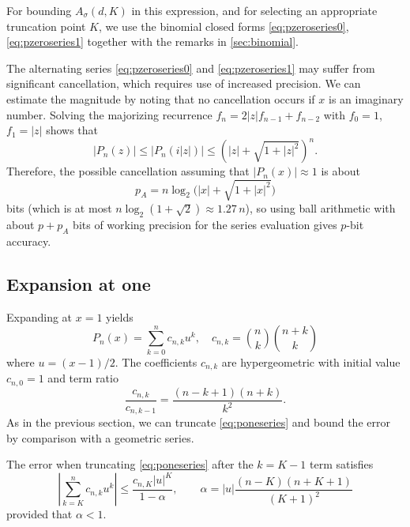 \documentclass[nohypdvips,review]{siamart0216}
\begin{document}
For bounding $A_{\sigma}(d,K)$ in this expression, and for selecting an
appropriate truncation point $K$, we use the binomial closed forms
\eqref{eq:pzeroseries0}, \eqref{eq:pzeroseries1} together with the
remarks in \cref{sec:binomial}.

The alternating series \cref{eq:pzeroseries0} and \cref{eq:pzeroseries1}
may suffer from significant cancellation, which requires use of
increased precision.
We can estimate the magnitude by
noting that no cancellation occurs
if $x$ is an imaginary number.
Solving the majorizing recurrence $f_n = 2 |z| f_{n-1} + f_{n-2}$ with
$f_0 = 1$, $f_1 = |z|$ shows that
\[ |P_n(z)| \le |P_n(i|z|)| \le \left(|z| + \sqrt{1 + |z|^2}\right)^n. \]
Therefore, the possible cancellation assuming that $|P_n(x)| \approx 1$
is about
\begin{equation*}
p_A = n \log_2\bigl(|x| + \sqrt{1 + |x|^2}\bigr)
\end{equation*}
bits (which is at most $n \log_2 (1+\sqrt{2}) \approx 1.27\, n$),
so using ball arithmetic with about $p + p_A$ bits of working precision
for the series evaluation gives $p$-bit accuracy.

\subsection{Expansion at one}

\label{sec:series-one}

Expanding at $x = 1$ yields
\begin{equation}
\label{eq:poneseries}
P_n(x) = \sum_{k=0}^n c_{n,k} u^k, \quad c_{n,k} = {n \choose k} {n+k \choose k}
\end{equation}
where $u = (x-1)/2$.
The coefficients $c_{n,k}$ are hypergeometric with initial value $c_{n,0} = 1$
and term ratio
\begin{equation}
\label{eq:poneprec}
\frac{c_{n,k}}{c_{n,k-1}} = \frac{(n-k+1)(n+k)}{k^2}.
\end{equation}
As in the previous section, we can truncate \cref{eq:poneseries} and
bound the error by comparison with a geometric series.

\begin{proposition}
\label{prop:poneseries}
The error when truncating \cref{eq:poneseries} after the $k = K - 1$ term satisfies
\begin{equation}
\label{eq:truncerr2}
\left| \sum_{k=K}^n c_{n,k} u^k \right| \le \frac{c_{n,K} |u|^K}{1-\alpha},
\qquad \alpha = |u| \frac{(n-K)(n+K+1)}{(K+1)^2}
\end{equation}
provided that $\alpha < 1$.
\end{proposition}
\end{document}
